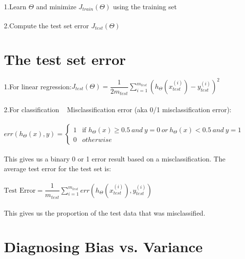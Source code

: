 \documentclass[UTF8]{ctexart}
\begin{document}
\paragraph{}
1.Learn $\Theta$ and minimize $J_{train}(\Theta)$ using the training set
\paragraph{}
2.Compute the test set error $J_{test}(\Theta)$
\section{The test set error}
1.For linear regression:$J_{test}(\Theta) = \dfrac{1}{2m_{test}} \sum_{i=1}^{m_{test}}(h_\Theta(x^{(i)}_{test}) - y^{(i)}_{test})^2$
\paragraph{}
2.For classification ~ Misclassification error (aka 0/1 misclassification error):
\paragraph{}
\begin{algorithm}
$err(h_\Theta(x),y) = \left\{\begin{array}{cc}1 & \mbox{if } h_\Theta(x) \geq 0.5\ and\ y = 0\ or\ h_\Theta(x) < 0.5\ and\ y = 1\\0 &  otherwise 
\end{array}\right. $\end{algorithm}
\paragraph{}
This gives us a binary 0 or 1 error result based on a misclassification. The average test error for the test set is:
\paragraph{}
$\text{Test Error} = \dfrac{1}{m_{test}} \sum^{m_{test}}_{i=1} err(h_\Theta(x^{(i)}_{test}), y^{(i)}_{test})$
\paragraph{}
This gives us the proportion of the test data that was misclassified.
\section{Diagnosing Bias vs. Variance}
\end{document}
